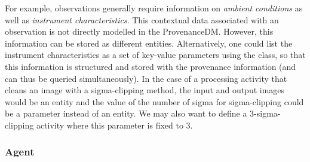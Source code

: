 For example, observations generally require information on \emph{ambient conditions} as well as 
\emph{instrument characteristics}. This contextual data associated with an observation is not directly modelled in the ProvenanceDM. However, this information can be stored as different entities. Alternatively, one could list the instrument characteristics as a set of key-value parameters using the  class, so that this information is structured and stored with the provenance information (and can thus be queried simultaneously). In the case of a processing activity that cleans an image with a sigma-clipping method, the input and output images would be an entity and the value of the number of sigma for sigma-clipping could be a parameter instead of an entity. We may also want to define a 3-sigma-clipping activity where this parameter is fixed to 3.


%




\subsubsection{Agent}\label{sec:w3c-agent}


